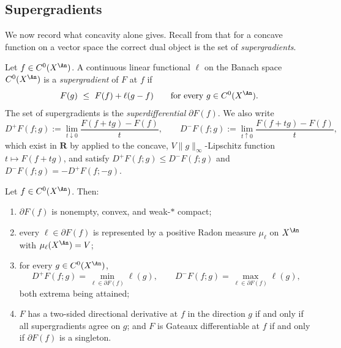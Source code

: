 \subsection{Supergradients}
\label{sec:ch27-supergradients}

We now record what concavity alone gives.  Recall from
 that for a concave function on a vector space
the correct dual object is the set of \emph{supergradients}.

\begin{definition}[Superdifferential]
\label{def:ch27-superdifferential}
Let $f\in C^0(X^{\An})$.  A continuous linear functional $\ell$ on the
Banach space $C^0(X^{\An})$ is a \emph{supergradient} of $F$ at $f$ if
\begin{equation}\label{eq:ch27-supergradient-inequality}
 F(g)\ \leq\ F(f)+\ell(g-f)
 \qquad\text{for every }g\in C^0(X^{\An}).
\end{equation}
The set of supergradients is the \emph{superdifferential} $\partial F(f)$.
We also write
\begin{equation}\label{eq:ch27-one-sided-directional}
 D^+F(f;g):=\lim_{t\downarrow0}\frac{F(f+tg)-F(f)}{t},
 \qquad
 D^-F(f;g):=\lim_{t\uparrow0}\frac{F(f+tg)-F(f)}{t},
\end{equation}
which exist in $\mathbf R$ by  applied to
the concave, $V\lVert g\rVert_\infty$-Lipschitz function
$t\mapsto F(f+tg)$, and satisfy $D^+F(f;g)\leq D^-F(f;g)$ and
$D^-F(f;g)=-D^+F(f;-g)$.
\end{definition}

\begin{theorem}
\label{thm:ch27-superdifferential}
Let $f\in C^0(X^{\An})$.  Then:
\begin{enumerate}
\item $\partial F(f)$ is nonempty, convex, and weak-$*$ compact;
\item every $\ell\in\partial F(f)$ is represented by a positive Radon
measure $\mu_\ell$ on $X^{\An}$ with
$\mu_\ell(X^{\An})=V$;
\item for every $g\in C^0(X^{\An})$,
\begin{equation}\label{eq:ch27-minmax-formula}
 D^+F(f;g)=\min_{\ell\in\partial F(f)}\ell(g),
 \qquad
 D^-F(f;g)=\max_{\ell\in\partial F(f)}\ell(g),
\end{equation}
both extrema being attained;
\item $F$ has a two-sided directional derivative at $f$ in the direction
$g$ if and only if all supergradients agree on $g$; and $F$ is Gateaux
differentiable at $f$ if and only if $\partial F(f)$ is a singleton.
\end{enumerate}
\end{theorem}

